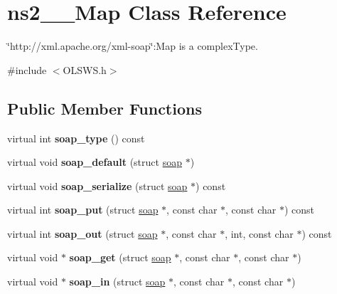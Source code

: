 \hypertarget{classns2____Map}{
\section{ns2\_\-\_\-Map Class Reference}
\label{classns2____Map}
}


\char`\"{}http://xml.apache.org/xml-\/soap\char`\"{}:Map is a complexType.  




{\ttfamily \#include $<$OLSWS.h$>$}

\subsection*{Public Member Functions}
\begin{DoxyCompactItemize}
\item 
\hypertarget{classns2____Map_a125c04eff834e28c379851b653f3a680}{
virtual int {\bfseries soap\_\-type} () const }
\label{classns2____Map_a125c04eff834e28c379851b653f3a680}

\item 
\hypertarget{classns2____Map_abf4f93ade694492acee2daf9ce25a72d}{
virtual void {\bfseries soap\_\-default} (struct \hyperlink{classns2____Map_aba9307fd142850a3b4a3b13e4c649572}{soap} $\ast$)}
\label{classns2____Map_abf4f93ade694492acee2daf9ce25a72d}

\item 
\hypertarget{classns2____Map_a3497ad9e6856b50f9d8926545e8cc18f}{
virtual void {\bfseries soap\_\-serialize} (struct \hyperlink{classns2____Map_aba9307fd142850a3b4a3b13e4c649572}{soap} $\ast$) const }
\label{classns2____Map_a3497ad9e6856b50f9d8926545e8cc18f}

\item 
\hypertarget{classns2____Map_ac444e82ea030ce99be55013a34ff7a76}{
virtual int {\bfseries soap\_\-put} (struct \hyperlink{classns2____Map_aba9307fd142850a3b4a3b13e4c649572}{soap} $\ast$, const char $\ast$, const char $\ast$) const }
\label{classns2____Map_ac444e82ea030ce99be55013a34ff7a76}

\item 
\hypertarget{classns2____Map_a56e2dd90a0b147af4395e6d15030308b}{
virtual int {\bfseries soap\_\-out} (struct \hyperlink{classns2____Map_aba9307fd142850a3b4a3b13e4c649572}{soap} $\ast$, const char $\ast$, int, const char $\ast$) const }
\label{classns2____Map_a56e2dd90a0b147af4395e6d15030308b}

\item 
\hypertarget{classns2____Map_a952ce0c3ad5bb3a8e28193dd9ee37e92}{
virtual void $\ast$ {\bfseries soap\_\-get} (struct \hyperlink{classns2____Map_aba9307fd142850a3b4a3b13e4c649572}{soap} $\ast$, const char $\ast$, const char $\ast$)}
\label{classns2____Map_a952ce0c3ad5bb3a8e28193dd9ee37e92}

\item 
\hypertarget{classns2____Map_a69c886c6248b38ddceaa243ffe7ee8f5}{
virtual void $\ast$ {\bfseries soap\_\-in} (struct \hyperlink{classns2____Map_aba9307fd142850a3b4a3b13e4c649572}{soap} $\ast$, const char $\ast$, const char $\ast$)}
\label{classns2____Map_a69c886c6248b38ddceaa243ffe7ee8f5}

\end{DoxyCompactItemize}
